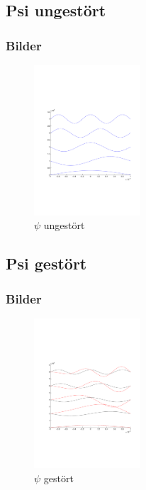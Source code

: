 \documentclass[aspectratio=169]{beamer}
\begin{document}
\subsection{ Psi ungest\"ort }
\begin{frame}
  \frametitle{ Bilder }
  \begin{figure}
    \centering
    \includegraphics[height=5.6cm,clip=true,trim=2cm 7.5cm 1cm 8cm]{../../skript/efeld/Psi_ungestoert.pdf}
    \caption{$\psi$ ungest\"ort}
    \label{abb:efeld_psi_ungestoert}
  \end{figure}

\end{frame}

\subsection{ Psi gest\"ort }
\begin{frame}
  \frametitle{ Bilder }
  \begin{figure}
    \centering
    \includegraphics[height=5.6cm,clip=true,trim=2cm 7.5cm 1cm 8cm]{../../skript/efeld/Psi_gestoert.pdf}
    \caption{$\psi$ gest\"ort}
    \label{abb:efeld_psi_gestoert}
  \end{figure}

\end{frame}
\end{document}
